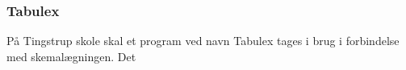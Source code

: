 \subsubsection*{Tabulex}
På Tingstrup skole skal et program ved navn Tabulex tages i brug i forbindelse med skemalægningen. Det 